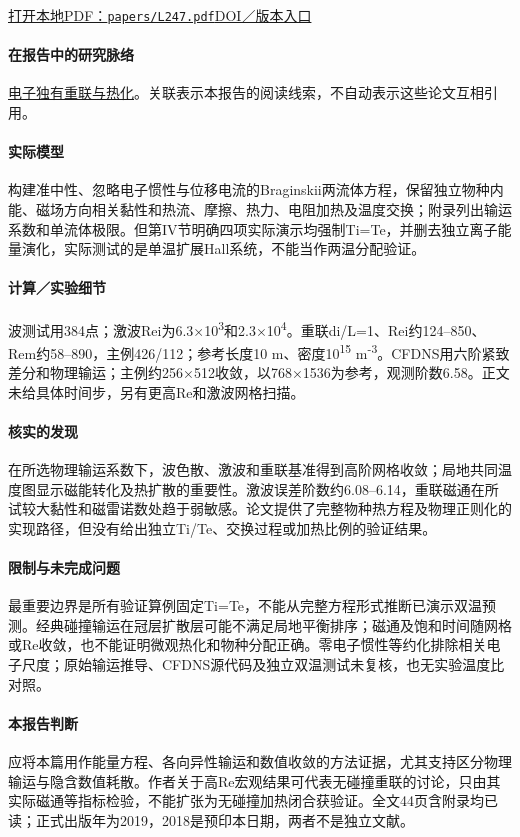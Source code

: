 \href{run:papers/L247.pdf}{打开本地PDF：\texttt{papers/L247.pdf}}\quad\href{https://doi.org/10.1063/1.5082190}{DOI／版本入口}

\paragraph{在报告中的研究脉络}\hyperref[story:energy]{电子独有重联与热化}。关联表示本报告的阅读线索，不自动表示这些论文互相引用。

\paragraph{实际模型}构建准中性、忽略电子惯性与位移电流的Braginskii两流体方程，保留独立物种内能、磁场方向相关黏性和热流、摩擦、热力、电阻加热及温度交换；附录列出输运系数和单流体极限。但第IV节明确四项实际演示均强制Ti=Te，并删去独立离子能量演化，实际测试的是单温扩展Hall系统，不能当作两温分配验证。

\paragraph{计算／实验细节}波测试用384点；激波Rei为6.3×10\textsuperscript{3}和2.3×10\textsuperscript{4}。重联di/L=1、Rei约124–850、Rem约58–890，主例426/112；参考长度10 m、密度10\textsuperscript{15} m\textsuperscript{-3}。CFDNS用六阶紧致差分和物理输运；主例约256×512收敛，以768×1536为参考，观测阶数6.58。正文未给具体时间步，另有更高Re和激波网格扫描。

\paragraph{核实的发现}在所选物理输运系数下，波色散、激波和重联基准得到高阶网格收敛；局地共同温度图显示磁能转化及热扩散的重要性。激波误差阶数约6.08–6.14，重联磁通在所试较大黏性和磁雷诺数处趋于弱敏感。论文提供了完整物种热方程及物理正则化的实现路径，但没有给出独立Ti/Te、交换过程或加热比例的验证结果。

\paragraph{限制与未完成问题}最重要边界是所有验证算例固定Ti=Te，不能从完整方程形式推断已演示双温预测。经典碰撞输运在冠层扩散层可能不满足局地平衡排序；磁通及饱和时间随网格或Re收敛，也不能证明微观热化和物种分配正确。零电子惯性等约化排除相关电子尺度；原始输运推导、CFDNS源代码及独立双温测试未复核，也无实验温度比对照。

\paragraph{本报告判断}应将本篇用作能量方程、各向异性输运和数值收敛的方法证据，尤其支持区分物理输运与隐含数值耗散。作者关于高Re宏观结果可代表无碰撞重联的讨论，只由其实际磁通等指标检验，不能扩张为无碰撞加热闭合获验证。全文44页含附录均已读；正式出版年为2019，2018是预印本日期，两者不是独立文献。

